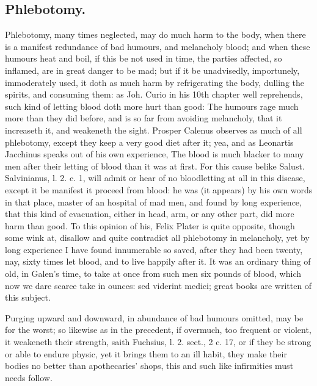 {{\subsection{Phlebotomy.}
Phlebotomy, many times neglected, may do much harm to
the body, when there is a manifest redundance of bad humours, and
melancholy blood; and when these humours heat and boil, if this be not
used in time, the parties affected, so inflamed, are in great danger to
be mad; but if it be unadvisedly, importunely, immoderately used, it
doth as much harm by refrigerating the body, dulling the spirits, and
consuming them: as Joh. Curio in his 10th chapter well
reprehends, such kind of letting blood doth more hurt than good:
The humours rage much more than they did before, and is so far
from avoiding melancholy, that it increaseth it, and weakeneth the
sight. Prosper Calenus observes as much of all phlebotomy, except
they keep a very good diet after it; yea, and as Leonartis
Jacchinus speaks out of his own experience, The blood is much
blacker to many men after their letting of blood than it was at first.
For this cause belike Salust. Salvinianus, l. 2. c. 1, will admit or
hear of no bloodletting at all in this disease, except it be manifest
it proceed from blood: he was (it appears) by his own words in that
place, master of an hospital of mad men, and found by long
experience, that this kind of evacuation, either in head, arm, or any
other part, did more harm than good. To this opinion of his,
Felix Plater is quite opposite, though some wink at, disallow and
quite contradict all phlebotomy in melancholy, yet by long experience I
have found innumerable so saved, after they had been twenty, nay, sixty
times let blood, and to live happily after it. It was an ordinary thing
of old, in Galen's time, to take at once from such men six pounds of
blood, which now we dare scarce take in ounces: sed viderint medici;
great books are written of this subject.

Purging upward and downward, in abundance of bad humours omitted, may
be for the worst; so likewise as in the precedent, if overmuch, too
frequent or violent, it weakeneth their strength, saith Fuchsius,
l. 2. sect., 2 c. 17, or if they be strong or able to endure physic,
yet it brings them to an ill habit, they make their bodies no better
than apothecaries' shops, this and such like infirmities must needs
follow.

}}
